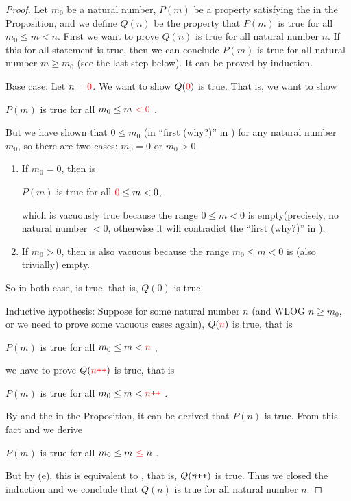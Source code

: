 \begin{proof}
Let \(m_0\) be a natural number, \(P(m)\) be a property satisfying the  in the Proposition, and we define \(Q(n)\) be the property that \(P(m)\) is true for all \(m_0 \leq m < n\). First we want to prove \(Q(n)\) is true for all natural number \(n\). If this for-all statement is true, then we can conclude \(P(m)\) is true for all natural number \(m \geq m_0\) (see the last step below). It can be proved by induction.

Base case: Let \(n = \RED{0}\). We want to show \(Q(\RED{0})\) is true. That is, we want to show
\begin{center}
    \(P(m)\) is true for all \(m_0 \leq m\ \RED{< 0}\) .
\end{center}
But we have shown that \(0 \leq m_0\) (in ``first (why?)'' in ) for any natural number \(m_0\), so there are two cases: \(m_0 = 0\) or \(m_0 > 0\).
\begin{enumerate}
    \item If \(m_0 = 0\), then  is
        \begin{center}
            \(P(m)\) is true for all \(\RED{0} \leq m < 0\),
        \end{center}
        which is vacuously true because the range \(0 \leq m < 0\) is empty(precisely, no natural number \(< 0\), otherwise it will contradict the ``first (why?)'' in ).
    \item If \(m_0 > 0\), then  is also vacuous because the range \(m_0 \leq m < 0\) is (also trivially) empty.
\end{enumerate}
So in both case,  is true, that is, \(Q(0)\) is true.

Inductive hypothesis: Suppose for some natural number \(n\) (and WLOG \(n \geq m_0\), or we need to prove some vacuous cases again), \(Q(\RED{n})\) is true, that is
\begin{center}
    \(P(m)\) is true for all \(m_0 \leq m < \RED{n}\) ,
\end{center}
we have to prove \(Q(\RED{n\INC})\) is true, that is
\begin{center}
    \(P(m)\) is true for all \(m_0 \leq m < \RED{n\INC}\) .
\end{center}
By  and the  in the Proposition, it can be derived that \(P(n)\) is true. From this fact and  we derive
\begin{center}
    \(P(m)\) is true for all \(m_0 \leq m\ \RED{\leq}\ n\) .
\end{center}
But by (e), this is equivalent to , that is, \(Q(n\texttt{++})\) is true. Thus we closed the induction and we conclude that \(Q(n)\) is true for all natural number \(n\).


\end{proof}
